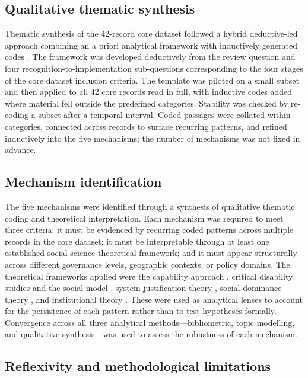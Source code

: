 \documentclass[12pt,a4paper]{article}
\begin{document}
\subsection*{Qualitative thematic synthesis}

Thematic synthesis of the 42-record core dataset followed a hybrid deductive-led approach combining an a priori analytical framework with inductively generated codes \cite{fereday2006demonstrating,azungah2018qualitative}. The framework was developed deductively from the review question and four recognition-to-implementation sub-questions corresponding to the four stages of the core dataset inclusion criteria. The template was piloted on a small subset and then applied to all 42 core records read in full, with inductive codes added where material fell outside the predefined categories. Stability was checked by re-coding a subset after a temporal interval. Coded passages were collated within categories, connected across records to surface recurring patterns, and refined inductively into the five mechanisms; the number of mechanisms was not fixed in advance.

\subsection*{Mechanism identification}

The five mechanisms were identified through a synthesis of qualitative thematic coding and theoretical interpretation. Each mechanism was required to meet three criteria: it must be evidenced by recurring coded patterns across multiple records in the core dataset; it must be interpretable through at least one established social-science theoretical framework; and it must appear structurally across different governance levels, geographic contexts, or policy domains. The theoretical frameworks applied were the capability approach \cite{sen_1999_development,nussbaum_2011_capabilities}, critical disability studies and the social model \cite{oliver_1990_politics}, system justification theory \cite{jost_2003_decade}, social dominance theory \cite{sidanius_pratto_1999_socdom}, and institutional theory \cite{dimaggio_powell_1983_ironcage}. These were used as analytical lenses to account for the persistence of each pattern rather than to test hypotheses formally. Convergence across all three analytical methods---bibliometric, topic modelling, and qualitative synthesis---was used to assess the robustness of each mechanism.

\subsection*{Reflexivity and methodological limitations}
\end{document}
